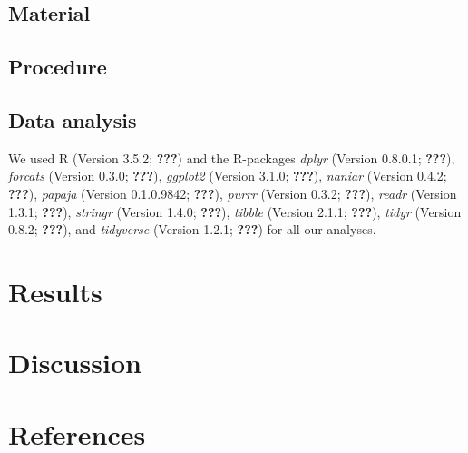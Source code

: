 \documentclass[man]{apa6}
\begin{document}
\subsection{Material}\label{material}

\subsection{Procedure}\label{procedure}

\subsection{Data analysis}\label{data-analysis}

We used R (Version 3.5.2; {\textbf{???}}) and the R-packages
\emph{dplyr} (Version 0.8.0.1; {\textbf{???}}), \emph{forcats} (Version
0.3.0; {\textbf{???}}), \emph{ggplot2} (Version 3.1.0; {\textbf{???}}),
\emph{naniar} (Version 0.4.2; {\textbf{???}}), \emph{papaja} (Version
0.1.0.9842; {\textbf{???}}), \emph{purrr} (Version 0.3.2;
{\textbf{???}}), \emph{readr} (Version 1.3.1; {\textbf{???}}),
\emph{stringr} (Version 1.4.0; {\textbf{???}}), \emph{tibble} (Version
2.1.1; {\textbf{???}}), \emph{tidyr} (Version 0.8.2; {\textbf{???}}),
and \emph{tidyverse} (Version 1.2.1; {\textbf{???}}) for all our
analyses.

\section{Results}\label{results}

\section{Discussion}\label{discussion}

\newpage

\section{References}\label{references}

\begingroup
\setlength{\parindent}{-0.5in} \setlength{\leftskip}{0.5in}

\hypertarget{refs}{}

\endgroup
\end{document}
